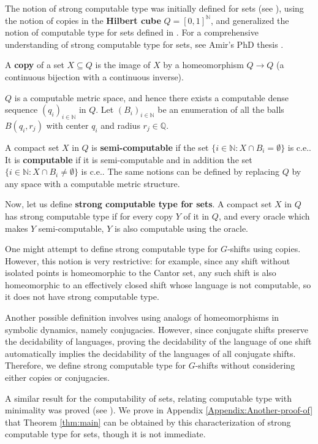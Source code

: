 \documentclass[french,american]{article}
\theoremstyle{plain}
\theoremstyle{definition}
\theoremstyle{remark}
\theoremstyle{plain}
\begin{document}
The notion of strong computable type was initially defined for sets
(see \cite{AH22c}), using the notion of copies in the \textbf{Hilbert
cube} $Q=[0,1]^{\mathbb{N}}$, and generalized the notion of
computable type for sets defined in \cite{IljazovicS18}. For a comprehensive understanding of strong computable type for sets, see Amir's PhD thesis \cite{Phdamir2024}.

A \textbf{copy} of a set $X\subseteq Q$ is the image of $X$ by a
homeomorphism $Q\rightarrow Q$ (a continuous bijection with a continuous
inverse).

$Q$ is a computable metric space, and hence there exists a computable
dense sequence $(q_{i})_{i\in\mathbb{N}}$ in $Q$. Let $(B_{i})_{i\in\mathbb{\mathbb{N}}}$ be an enumeration of
all the balls $B(q_{i},r_{j})$ with center $q_{i}$ and radius $r_{j}\in\mathbb{Q}$.

A compact set $X$ in $Q$ is \textbf{semi-computable} if the set
$\{i\in\mathbb{N}:X\cap B_{i}=\emptyset\}$ is c.e.. It is \textbf{computable}
if it is semi-computable and in addition the set $\{i\in\mathbb{N}:X\cap B_{i}\neq\emptyset\}$
is c.e.. The same notions can be defined by replacing $Q$ by any
space with a computable metric structure.

Now, let us define \textbf{strong computable type for sets}. A compact
set $X$ in $Q$ has strong computable type if for every copy $Y$
of it in $Q$, and every oracle which makes $Y$ semi-computable,
$Y$ is also computable using the oracle.

One might attempt to define strong computable type for $G$-shifts
using copies. However, this notion is very restrictive: for example, since any shift without isolated points is homeomorphic to the Cantor set, any such shift is also homeomorphic to an effectively closed shift whose language is not computable, so it does not have strong computable type.

Another possible definition involves using analogs of homeomorphisms
in symbolic dynamics, namely conjugacies. However, since conjugate
shifts preserve the decidability of languages, proving the decidability
of the language of one shift automatically implies the decidability
of the languages of all conjugate shifts. Therefore, we define strong
computable type for $G$-shifts without considering either copies
or conjugacies.

A similar result for the computability of sets, relating computable
type with minimality was proved (see \foreignlanguage{french}{\cite{AH22c,Phdamir2024})}.
We prove in Appendix \ref{Appendix:Another-proof-of} that Theorem
\ref{thm:main} can be obtained by this characterization of
strong computable type for sets, though it is not immediate.
\end{document}
